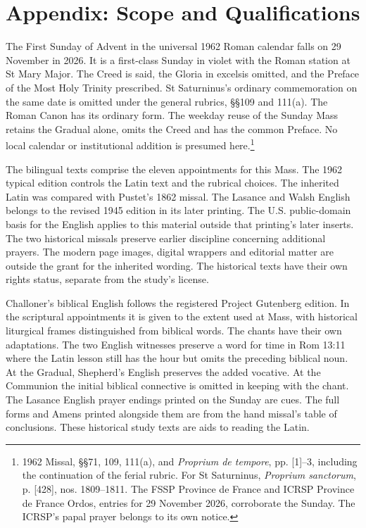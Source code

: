 \section{Appendix: Scope and Qualifications}

The First Sunday of Advent in the universal 1962 Roman calendar falls on 29 November in 2026. It is a first-class Sunday in violet with the Roman station at St Mary Major. The Creed is said, the Gloria in excelsis omitted, and the Preface of the Most Holy Trinity prescribed. St Saturninus's ordinary commemoration on the same date is omitted under the general rubrics, §§109 and 111(a). The Roman Canon has its ordinary form. The weekday reuse of the Sunday Mass retains the Gradual alone, omits the Creed and has the common Preface. No local calendar or institutional addition is presumed here.\footnote{1962 Missal,  §§71, 109, 111(a), and \emph{Proprium de tempore}, pp. [1]--3, including the continuation of the ferial rubric. For St Saturninus, \emph{Proprium sanctorum}, p. [428], nos. 1809--1811. The FSSP Province de France and ICRSP Province de France Ordos, entries for 29 November 2026, corroborate the Sunday. The ICRSP's papal prayer belongs to its own notice.}

The bilingual texts comprise the eleven appointments for this Mass. The 1962 typical edition controls the Latin text and the rubrical choices. The inherited Latin was compared with Pustet's 1862 missal. The Lasance and Walsh English belongs to the revised 1945 edition in its later printing. The U.S. public-domain basis for the English applies to this material outside that printing's later inserts. The two historical missals preserve earlier discipline concerning additional prayers. The modern page images, digital wrappers and editorial matter are outside the grant for the inherited wording. The historical texts have their own rights status, separate from the study's license.

Challoner's biblical English follows the registered Project Gutenberg edition. In the scriptural appointments it is given to the extent used at Mass, with historical liturgical frames distinguished from biblical words. The chants have their own adaptations. The two English witnesses preserve a word for time in Rom 13:11 where the Latin lesson still has the hour but omits the preceding biblical noun. At the Gradual, Shepherd's English preserves the added vocative. At the Communion the initial biblical connective is omitted in keeping with the chant. The Lasance English prayer endings printed on the Sunday are cues. The full forms and Amens printed alongside them are from the hand missal's table of conclusions. These historical study texts are aids to reading the Latin.

